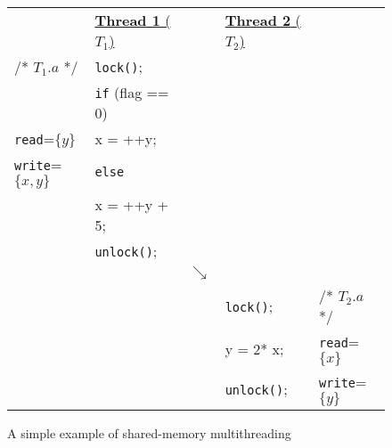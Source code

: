 \begin{figure}[t]
\centering
\myfontsize
{
\begin{tabular}
{m{1.5cm} m{2cm} m{0.1cm} m{1.8cm} m{1.2cm}}
&\underline{{\bf Thread 1} ($T_1$)} & & \underline{ {\bf Thread 2}  ($T_2$)} &\\ 
 

/* \underline{$T_{1}.a$} */ & {\tt lock()}; && &\\
& {\tt if} (flag == 0) && &\\
{\tt read}=$\{y\}$  & \hspace{3mm} x = ++y;&& &\\
{\tt write}=$\{x, y\}$  & {\tt else} && &\\
&\hspace{3mm}   x = ++y + 5;&& &\\
  & {\tt unlock()};&& &\\
        &  &  $\searrow$ & & \\
   

&&  & {\tt lock()}; &  /* \underline{$T_{2}.a$ }*/\\
&&  & y = 2* x;    & {\tt read}=$\{x\}$  \\
&  &  & {\tt unlock()}; &  {\tt write}=$\{y\}$ \\  
\end{tabular}
}


\caption{ A simple example of shared-memory multithreading}
\label{fig:simple-example}
\end{figure}
